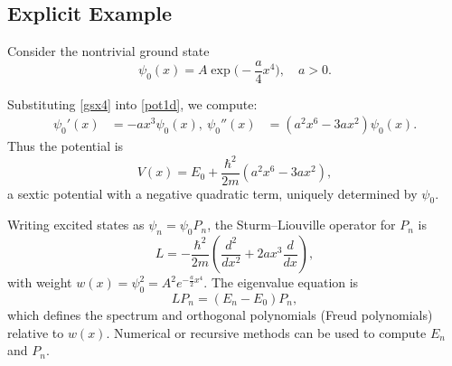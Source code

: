\subsection{Explicit Example}

Consider the nontrivial ground state
\begin{equation}
    \label{gsx4}
\psi_0(x) = A \exp\Big(-\frac{a}{4} x^4\Big), \quad a>0.
\end{equation}

Substituting \eqref{gsx4} into \eqref{pot1d}, we compute:
\begin{align*}
\psi_0'(x) &= -a x^3 \psi_0(x), \
\psi_0''(x) &= (a^2 x^6 - 3 a x^2) \psi_0(x).
\end{align*}
Thus the potential is
\begin{equation}
V(x) = E_0 + \frac{\hbar^2}{2m} (a^2 x^6 - 3 a x^2),
\end{equation}
a sextic potential with a negative quadratic term, uniquely determined by $\psi_0$.

Writing excited states as $\psi_n = \psi_0 P_n$, the Sturm--Liouville operator for $P_n$ is
\begin{equation}
L = -\frac{\hbar^2}{2m} \left( \frac{d^2}{dx^2} + 2 a x^3 \frac{d}{dx} \right),
\end{equation}
with weight $w(x) = \psi_0^2 = A^2 e^{- \frac{a}{2} x^4}$. The eigenvalue equation is
\begin{equation}
L P_n = (E_n - E_0) P_n,
\end{equation}
which defines the spectrum and orthogonal polynomials (Freud polynomials) relative to $w(x)$.
Numerical or recursive methods can be used to compute $E_n$ and $P_n$.

